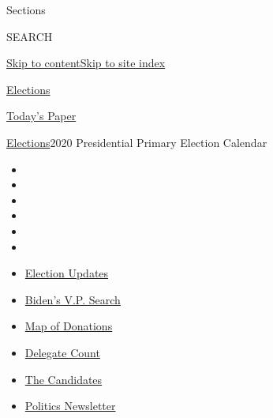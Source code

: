 Sections

SEARCH

\protect\hyperlink{site-content}{Skip to
content}\protect\hyperlink{site-index}{Skip to site index}

\href{https://www.nytimes.com/news-event/2020-election}{Elections}

\href{https://myaccount.nytimes.com/auth/login?response_type=cookie\&client_id=vi}{}

\href{https://www.nytimes.com/section/todayspaper}{Today's Paper}

\href{/news-event/2020-election}{Elections}\textbar{}2020 Presidential
Primary Election Calendar

\begin{itemize}
\item
\item
\item
\item
\item
\item
\end{itemize}

\begin{itemize}
\item
  \href{https://www.nytimes.com/2020/07/31/us/elections/biden-vs-trump.html?action=click\&pgtype=Article\&state=default\&region=TOP_BANNER\&context=storylines_menu}{Election
  Updates}
\item
  \href{https://www.nytimes.com/article/biden-vice-president-2020.html?action=click\&pgtype=Article\&state=default\&region=TOP_BANNER\&context=storylines_menu}{Biden's
  V.P. Search}
\item
  \href{https://www.nytimes.com/interactive/2020/07/24/us/politics/trump-biden-campaign-donors.html?action=click\&pgtype=Article\&state=default\&region=TOP_BANNER\&context=storylines_menu}{Map
  of Donations}
\item
  \href{https://www.nytimes.com/interactive/2020/us/elections/delegate-count-primary-results.html?action=click\&pgtype=Article\&state=default\&region=TOP_BANNER\&context=storylines_menu}{Delegate
  Count}
\item
  \href{https://www.nytimes.com/interactive/2019/us/politics/2020-presidential-candidates.html?action=click\&pgtype=Article\&state=default\&region=TOP_BANNER\&context=storylines_menu}{The
  Candidates}
\item
  \href{https://www.nytimes.com/newsletters/politics?action=click\&pgtype=Article\&state=default\&region=TOP_BANNER\&context=storylines_menu}{Politics
  Newsletter}
\end{itemize}

